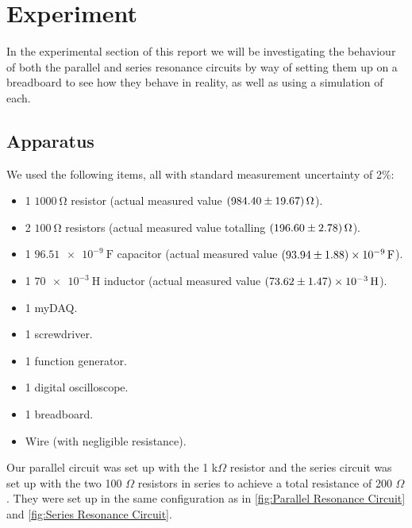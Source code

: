 \documentclass[12pt]{article}
\numberwithin{equation}{section}
\numberwithin{figure}{section}
\begin{document}
    \section{Experiment}\label{sec:Experiment}
    In the experimental section of this report we will be investigating the behaviour of both the 
    parallel and series resonance circuits by way of setting them up on a breadboard to see how they 
    behave in reality, as well as using a simulation of each. 
    \subsection{Apparatus}\label{sec:Apparatus}
    We used the following items, all with standard measurement uncertainty of 2\%:
    \begin{itemize}
        \item 1 $\SI{1000}{\ohm}$ resistor (actual measured value $\SI{984.40\pm19.67}{\ohm}$).
        \item 2 $\SI{100}{\ohm}$ resistors (actual measured value totalling $\SI{196.60\pm2.78}{\ohm}$).
        \item 1 $\SI{96.51e-9}{\farad}$ capacitor (actual measured value $\SI{93.94\pm1.88e-9}{\farad}$).
        \item 1 $\SI{70e-3}{\henry}$ inductor (actual measured value $\SI{73.62\pm1.47e-3}{\henry}$).
        \item 1 myDAQ.
        \item 1 screwdriver.
        \item 1 function generator.
        \item 1 digital oscilloscope.
        \item 1 breadboard.
        \item Wire (with negligible resistance).
    \end{itemize}
    Our parallel circuit was set up with the 1 k$\Omega$ resistor and the series circuit was set up 
    with the two 100 $\Omega$ resistors in series to achieve a total resistance of 200 $\Omega$. 
    They were set up in the same configuration as in \autoref{fig:Parallel Resonance Circuit} and 
    \autoref{fig:Series Resonance Circuit}. 
\end{document}
